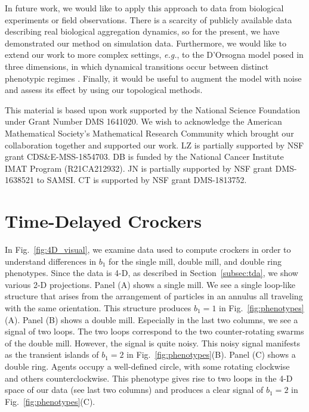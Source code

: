 \documentclass[%
 aip,
reprint,
 amsmath,amssymb,
 aps,
showkeys
]{revtex4-1}
\begin{document}
In future work, we would like to apply this approach to data from biological experiments or field observations. There is a scarcity of publicly available data describing real biological aggregation dynamics, so for the present, we have demonstrated our method on simulation data. Furthermore, we would like to extend our work to more complex settings, \emph{e.g.}, to the D'Orsogna model posed in three dimensions, in which dynamical transitions occur between distinct phenotypic regimes \cite{chuang_swarming_2016}. Finally, it would be useful to augment the model with noise and assess its effect by using our topological methods.

\begin{acknowledgments}
This material is based upon work supported by the National Science Foundation under Grant Number DMS 1641020. We wish to acknowledge the American Mathematical Society's Mathematical Research Community which brought our collaboration together and supported our work. LZ is partially supported by NSF grant CDS\&E-MSS-1854703. DB is funded by the National Cancer Institute IMAT Program (R21CA212932). JN is partially supported by NSF
grant DMS-1638521 to SAMSI. CT is supported by NSF grant DMS-1813752.
\end{acknowledgments}

\appendix



\section{Time-Delayed Crockers}
\label{app:4Dvis}

In Fig.~\ref{fig:4D_visual}, we examine data used to compute crockers in order to understand differences in $b_1$ for the single mill, double mill, and double ring phenotypes. Since the data is 4-D, as described in Section~\ref{subsec:tda}, we show various 2-D projections. Panel (A) shows a single mill. We see a single loop-like structure that arises from the arrangement of particles in an annulus all traveling with the same orientation. This structure produces $b_1=1$ in Fig.~\ref{fig:phenotypes}(A). Panel (B) shows a double mill. Especially in the last two columns, we see a signal of two loops. The two loops correspond to the two counter-rotating swarms of the double mill. However, the signal is quite noisy. This noisy signal manifests as the transient islands of $b_1=2$ in Fig.~\ref{fig:phenotypes}(B).  Panel (C) shows a double ring. Agents occupy a well-defined circle, with some rotating clockwise and others counterclockwise. This phenotype gives rise to two loops in the 4-D space of our data (see last two columns) and produces a clear signal of $b_1=2$ in Fig.~\ref{fig:phenotypes}(C).
\end{document}
